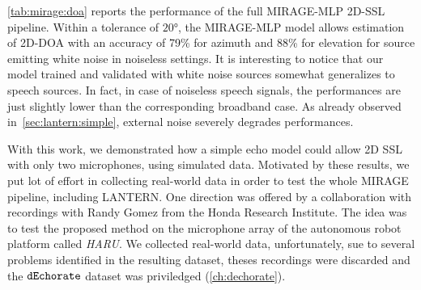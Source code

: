 \cref{tab:mirage:doa} reports the performance of the full MIRAGE-MLP 2D-SSL pipeline.
Within a tolerance of $\ang{20}$, the MIRAGE-MLP model allows estimation of 2D-\ac{DOA} with an accuracy of 79\% for azimuth and 88\% for elevation for source emitting white noise in noiseless settings.
It is interesting to notice that our model trained and validated with white noise sources somewhat generalizes to speech sources.
In fact, in case of noiseless speech signals, the performances are just slightly lower than the corresponding broadband case.
As already observed in~\cref{sec:lantern:simple}, external noise severely degrades performances.

\mynewline
With this work, we demonstrated how a simple echo model could allow 2D SSL with only two microphones, using simulated data.
Motivated by these results, we put lot of effort in collecting real-world data in order to test the whole \ac{MIRAGE} pipeline, including \ac{LANTERN}.
One direction was offered by a collaboration with recordings with Randy Gomez from the Honda Research Institute.
The idea was to test the proposed method on the microphone array of the autonomous robot platform called \textit{HARU}.
We collected real-world data, unfortunately, sue to several problems identified in the resulting dataset, theses recordings were discarded and the $\texttt{dEchorate}$ dataset was priviledged (\cref{ch:dechorate}).




